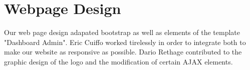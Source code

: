 \chapter{Webpage Design}

Our web page design adapated bootstrap as well as elements of the template "Dashboard Admin". Eric Cuiffo worked tirelessly in order to integrate both to make our website as responsive as possible.
Dario Rethage contributed to the graphic design of the logo and the modification of certain AJAX elements.
